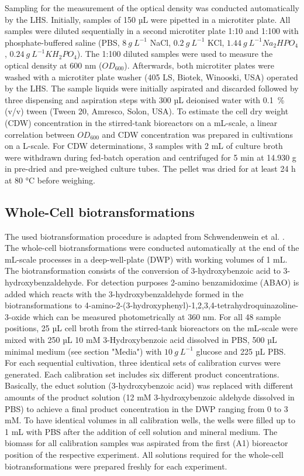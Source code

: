 \documentclass[sn-standardnature]{sn-jnl}%
\theoremstyle{thmstyleone}%
\theoremstyle{thmstyletwo}%
\theoremstyle{thmstylethree}%
\begin{document}
Sampling for the measurement of the optical density was conducted automatically by the LHS.
Initially, samples of 150 µL were pipetted in a microtiter plate.
All samples were diluted sequentially in a second microtiter plate 1:10 and 1:100 with phosphate-buffered saline (PBS, $8\ g\ L^{-1}$ NaCl, $0.2\ g\ L^{-1}$ KCl, $1.44\ g\ L^{-1} Na_{2}HPO_{4}$, $0.24\ g\ L^{-1} KH_{2}PO_{4}$).
The 1:100 diluted samples were used to measure the optical density at 600 nm ($OD_{600}$).
Afterwards, both microtiter plates were washed with a microtiter plate washer (405 LS, Biotek, Winooski, USA) operated by the LHS.
The sample liquids were initially aspirated and discarded followed by three dispensing and aspiration steps with 300 µL deionised water with 0.1~\% (v/v) tween (Tween 20, Amresco, Solon, USA).
To estimate the cell dry weight (CDW) concentration in the stirred-tank bioreactors on a mL-scale, a linear correlation between $OD_{600}$ and CDW concentration was prepared in cultivations on a L-scale.
For CDW determinations, 3 samples with 2 mL of culture broth were withdrawn during fed-batch operation and centrifuged for 5 min at 14.930 g in pre-dried and pre-weighed culture tubes.
The pellet was dried for at least 24 h at 80 °C before weighing.


\subsection{Whole-Cell biotransformations}
The used biotransformation procedure is adapted from Schwendenwein et al. \cite{schwendenwein2019random}.
The whole-cell biotransformations were conducted automatically at the end of the mL-scale processes in a deep-well-plate (DWP) with working volumes of 1 mL.
The biotransformation consists of the conversion of 3-hydroxybenzoic acid to 3-hydroxybenzaldehyde.
For detection purposes 2-amino benzamidoxime (ABAO) is added which reacts with the 3-hydroxybenzaldehyde formed in the biotransformations to 4-amino-2-(3-hydroxyphenyl)-1,2,3,4-tetrahydroquinazoline-3-oxide which can be measured photometrically at 360 nm.
For all 48 sample positions, 25 µL cell broth from the stirred-tank bioreactors on the mL-scale were mixed with 250 µL 10 mM 3-Hydroxybenzoic acid dissolved in PBS, 500 µL minimal  medium (see section "Media") with $10\ g\ L^{-1}$ glucose and 225 µL PBS.
For each sequential cultivation, three identical sets of calibration curves were generated.
Each calibration set includes six different product concentrations.
Basically, the educt solution (3-hydroxybenzoic acid) was replaced with different amounts of the product solution (12 mM 3-hydroxybenzoic aldehyde dissolved in PBS) to achieve a final product concentration in the DWP ranging from 0 to 3 mM.
To have identical volumes in all calibration wells, the wells were filled up to 1 mL with PBS after the addition of cell solution and mineral medium.
The biomass for all calibration samples was aspirated from the first (A1) bioreactor position of the respective experiment.
All solutions required for the whole-cell biotransformations were prepared freshly for each experiment.
\end{document}
